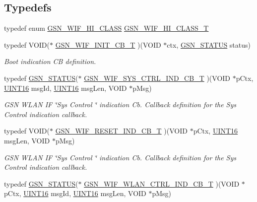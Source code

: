 \subsection*{Typedefs}
\begin{DoxyCompactItemize}
\item 
typedef enum \hyperlink{a00608_ad57dfb23fbead4a670f7e5b7de94019a}{GSN\_\-WIF\_\-HI\_\-CLASS} \hyperlink{a00608_a6fed68726c005805e6c3841b055b1b8b}{GSN\_\-WIF\_\-HI\_\-CLASS\_\-T}
\item 
typedef VOID($\ast$ \hyperlink{a00636_gad3465a5565359704a4c7d30e8e3ff127}{GSN\_\-WIF\_\-INIT\_\-CB\_\-T} )(VOID $\ast$ctx, \hyperlink{a00660_gada5951904ac6110b1fa95e51a9ddc217}{GSN\_\-STATUS} status)
\begin{DoxyCompactList}\small\item\em Boot indication CB definition. \end{DoxyCompactList}\item 
typedef \hyperlink{a00660_gada5951904ac6110b1fa95e51a9ddc217}{GSN\_\-STATUS}($\ast$ \hyperlink{a00635_ga6079bd2ef0b375f3d1b987c9e3de8f6b}{GSN\_\-WIF\_\-SYS\_\-CTRL\_\-IND\_\-CB\_\-T} )(VOID $\ast$pCtx, \hyperlink{a00660_ga09f1a1fb2293e33483cc8d44aefb1eb1}{UINT16} msgId, \hyperlink{a00660_ga09f1a1fb2293e33483cc8d44aefb1eb1}{UINT16} msgLen, VOID $\ast$pMsg)
\begin{DoxyCompactList}\small\item\em GSN WLAN IF \char`\"{}Sys Control \char`\"{} indication Cb. Callback definition for the Sys Control indication callback. \end{DoxyCompactList}\item 
typedef VOID($\ast$ \hyperlink{a00635_gad71afa8e03b517ec379abfa3cb39de92}{GSN\_\-WIF\_\-RESET\_\-IND\_\-CB\_\-T} )(VOID $\ast$pCtx, \hyperlink{a00660_ga09f1a1fb2293e33483cc8d44aefb1eb1}{UINT16} msgLen, VOID $\ast$pMsg)
\begin{DoxyCompactList}\small\item\em GSN WLAN IF \char`\"{}Sys Control \char`\"{} indication Cb. Callback definition for the Sys Control indication callback. \end{DoxyCompactList}\item 
typedef \hyperlink{a00660_gada5951904ac6110b1fa95e51a9ddc217}{GSN\_\-STATUS}($\ast$ \hyperlink{a00635_ga1a6c66e709c29a827dc0c07e40f4b9aa}{GSN\_\-WIF\_\-WLAN\_\-CTRL\_\-IND\_\-CB\_\-T} )(VOID $\ast$pCtx, \hyperlink{a00660_ga09f1a1fb2293e33483cc8d44aefb1eb1}{UINT16} msgId, \hyperlink{a00660_ga09f1a1fb2293e33483cc8d44aefb1eb1}{UINT16} msgLen, VOID $\ast$pMsg)

\end{DoxyCompactItemize}
